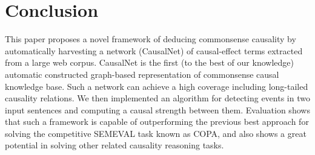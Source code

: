 \section{Conclusion}
\label{sec:conclude} This paper proposes a novel framework of
deducing commonsense causality by automatically harvesting a network
(CausalNet) of causal-effect terms extracted from a large web corpus. 
CausalNet is the first (to the best of our
knowledge) automatic constructed graph-based
representation of commonsense causal knowledge base.
Such a network can achieve a high coverage including long-tailed causality
relations. We then implemented an algorithm for detecting events in
two input sentences and computing a causal strength between them.
Evaluation shows that such a framework is capable of outperforming
the previous best approach for solving the competitive SEMEVAL task
known as COPA, and also shows a great potential in solving other
related causality reasoning tasks.

%
